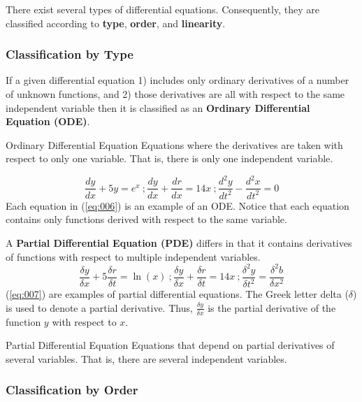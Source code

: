\documentclass[12pt]{article}
\begin{document}
There exist several types of differential equations. Consequently, they are classified according to \textbf{type}, \textbf{order}, and \textbf{linearity}.

\subsubsection{Classification by Type}
\label{sssec:classificationByType}

If a given differential equation 1) includes only ordinary derivatives of a number of unknown functions, and 2) those derivatives are all with respect to the same independent variable then it is classified as an \textbf{Ordinary Differential Equation (ODE)}.

\begin{definition}{Ordinary Differential Equation}
  Equations where the derivatives are taken with respect to only one variable. That is, there is only one independent variable.
\end{definition}

\begin{equation}
  \frac{dy}{dx}+5y=e^x \ ;\frac{dy}{dx} + \frac{dr}{dx} = 14x\ ;\frac{d^2y}{dt^2}-\frac{d^2x}{dt^2} = 0
  \label{eq:006}
\end{equation}
Each equation in (\ref{eq:006}) is an example of an ODE. Notice that each equation contains only functions derived with respect to the same variable.

A \textbf{Partial Differential Equation (PDE)} differs in that it contains derivatives of functions with respect to multiple independent variables.
\begin{equation}
  \frac{\delta y}{\delta x}+5 \frac{\delta r}{\delta t}=\ln(x) \ ;\frac{\delta y}{\delta x} + \frac{\delta r}{\delta t} = 14x\ ;\frac{\delta ^2y}{\delta t^2} = \frac{\delta ^2b}{\delta x^2}
  \label{eq:007}
\end{equation}
(\ref{eq:007}) are examples of partial differential equations. The Greek letter delta ($\delta$) is used to denote a partial derivative. Thus, $\frac{\delta y}{\delta x}$ is the partial derivative of the function $y$ with respect to $x$.

\begin{definition}{Partial Differential Equation}
  Equations that depend on partial derivatives of several variables. That is, there are several independent variables.
\end{definition}

\subsubsection{Classification by Order}
\label{sssec:classificationByOrder}
\end{document}
